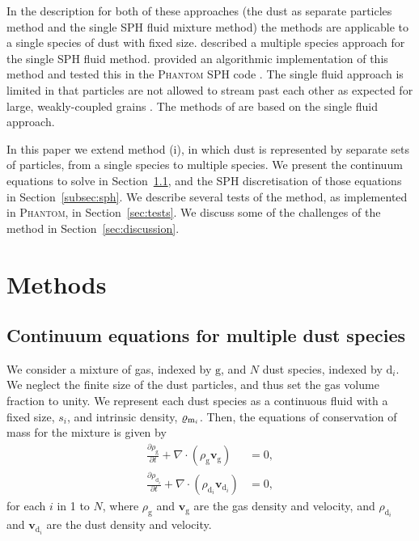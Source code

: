 \documentclass[fleqn,usenatbib]{mnras}
\newcommand{\g}{\mathrm{g}}
\newcommand{\dd}{\mathrm{d}}
\let\vec\bm
\begin{document}
In the description for both of these approaches (the dust as separate particles
method and the single SPH fluid mixture method) the methods are applicable to a
single species of dust with fixed size. \citet{Laibe2014MNRAS.444.1940L}
described a multiple species approach for the single SPH fluid method.
\citet{Hutchison2018MNRAS.476.2186H} provided an algorithmic implementation of
this method and tested this in the \textsc{Phantom} SPH code
\citep{Price2018PASA...35...31P}. The single fluid approach is limited in that
particles are not allowed to stream past each other as expected for large,
weakly-coupled grains \citep{Laibe2014MNRAS.440.2147L}. The methods of
\citet{Benitez-Llambay2019ApJS..241...25B,
Lebreuilly2019A&A...626A..96L,Li2019ApJ...878...39L} are based on the single
fluid approach.

In this paper we extend method (i), in which dust is represented by separate
sets of particles, from a single species to multiple species. We present the
continuum equations to solve in Section~\ref{subsec:continuum}, and the SPH
discretisation of those equations in Section~\ref{subsec:sph}. We describe
several tests of the method, as implemented in \textsc{Phantom}, in
Section~\ref{sec:tests}. We discuss some of the challenges of the method in
Section~\ref{sec:discussion}.

\section{Methods}

\subsection{Continuum equations for multiple dust species}%
\label{subsec:continuum}

We consider a mixture of gas, indexed by \(\g\), and \(N\) dust species, indexed
by \(\dd_i\). We neglect the finite size of the dust particles, and thus set the
gas volume fraction to unity. We represent each dust species as a continuous
fluid with a fixed size, \(s_i\), and intrinsic density, \(\varrho_{{\rm
m}_i}\). Then, the equations of conservation of mass for the mixture is given by
%
\begin{align}
   \label{eqn:conserve-gas-mass}
   \frac{\partial \rho_{\g}}{\partial t} + \nabla \cdot (\rho_{\g} \vec{v}_{\g}) &= 0, \\
   \label{eqn:conserve-dust-mass}
   \frac{\partial \rho_{\dd_i}}{\partial t} + \nabla \cdot (\rho_{\dd_i} \vec{v}_{\dd_i}) &= 0,
\end{align}
%
for each \(i\) in 1 to \(N\), where \(\rho_{\g}\) and \(\vec{v}_{\g}\) are the gas
density and velocity, and \(\rho_{\dd_i}\) and \(\vec{v}_{\dd_i}\) are the dust
density and velocity.
\end{document}
